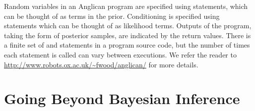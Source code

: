 Random variables in an Anglican program are specified using \sample statements, which can be thought of as terms in the prior. Conditioning is specified using \observe statements which can be thought of as likelihood terms.  Outputs of the program, taking the form of posterior samples, are indicated by the return values.  There is a finite set of \sample and \observe statements in a program source code, but the number of times each statement is called can vary between executions.  We refer the reader to  \href{http://www.robots.ox.ac.uk/~fwood/anglican/}{\small\url{http://www.robots.ox.ac.uk/~fwood/anglican/}} for more details.

\section{Going Beyond Bayesian Inference}
\label{sec:probprog:limit}
